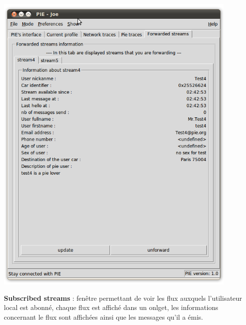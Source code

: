 \begin{center}
    \includegraphics[width=0.9\textwidth]{img/forwarded.png}
\end{center}

\textbf{Subscribed streams} : fenêtre permettant de voir les flux auxquels l'utilisateur local est abonné, chaque flux est affiché dans un onlget,
les informations concernant le flux sont affichées ainsi que les messages qu'il a émis.\\

